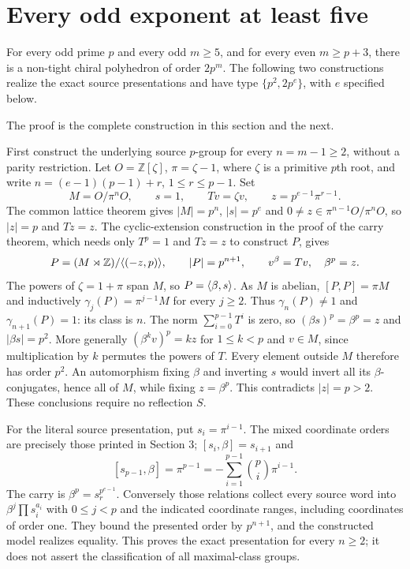 \section{Every odd exponent at least five}
\begin{theorem}\label{F2.Existence}
For every odd prime $p$ and every odd $m\geq5$, and for every even
$m\geq p+3$, there is a non-tight chiral polyhedron of order
$2p^m$. The following two constructions realize the exact source
presentations and have type $\{p^2,2p^e\}$, with $e$ specified below.
\end{theorem}
The proof is the complete construction in this section and the next.

First construct the underlying source $p$-group for every $n=m-1\geq2$,
without a parity restriction. Let $O=\mathbb Z[\zeta]$, $\pi=\zeta-1$,
where $\zeta$ is a primitive $p$th root, and write
$n=(e-1)(p-1)+r$, $1\leq r\leq p-1$. Set
\[
M=O/\pi^nO,\qquad s=1,\qquad Tv=\zeta v,
\qquad z=p^{e-1}\pi^{r-1}.
\]
The common lattice theorem gives $|M|=p^n$, $|s|=p^e$ and
$0\ne z\in\pi^{n-1}O/\pi^nO$, so $|z|=p$ and $Tz=z$.
The cyclic-extension construction in the proof of the carry theorem,
which needs only $T^p=1$ and $Tz=z$ to construct $P$, gives
\[
P=(M\rtimes\mathbb Z)/\langle (-z,p)\rangle,\qquad
|P|=p^{n+1},\qquad v^\beta=Tv,\quad\beta^p=z.
\]
The powers of $\zeta=1+\pi$ span $M$, so $P=\langle \beta,s\rangle$.
As $M$ is abelian, $[P,P]=\pi M$ and inductively
$\gamma_j(P)=\pi^{j-1}M$ for every $j\geq2$.
Thus $\gamma_n(P)\ne1$ and $\gamma_{n+1}(P)=1$: its class is $n$.
The norm $\sum_{i=0}^{p-1}T^i$ is zero, so
$(\beta s)^p=\beta^p=z$ and $|\beta s|=p^2$.
More generally $(\beta^kv)^p=kz$ for $1\leq k<p$ and $v\in M$,
since multiplication by $k$ permutes the powers of $T$.
Every element outside $M$ therefore has order $p^2$.
An automorphism fixing $\beta$ and inverting $s$ would invert all its
$\beta$-conjugates, hence all of $M$, while fixing $z=\beta^p$.
This contradicts $|z|=p>2$. These conclusions require no reflection $S$.

For the literal source presentation, put $s_i=\pi^{i-1}$.
The mixed coordinate orders are precisely those printed in Section 3;
$[s_i,\beta]=s_{i+1}$ and
\[
[s_{p-1},\beta]=\pi^{p-1}
=-\sum_{i=1}^{p-1}\binom pi\pi^{i-1}.
\]
The carry is $\beta^p=s_r^{p^{e-1}}$.
Conversely those relations collect every source word into
$\beta^j\prod s_i^{a_i}$ with $0\leq j<p$ and the indicated coordinate
ranges, including coordinates of order one. They bound the presented
order by $p^{n+1}$, and the constructed model realizes equality.
This proves the exact presentation for every $n\geq2$; it does not
assert the classification of all maximal-class groups.


